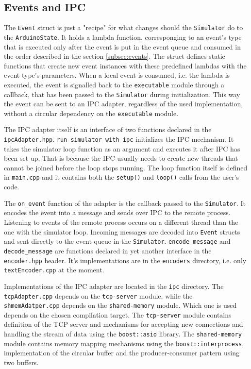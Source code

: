 \subsection{Events and IPC}\label{subsec:cpp-events}

The \texttt{Event} struct is just a "recipe" for what changes should the \texttt{Simulator} do to the \texttt{ArduinoState}. It holds a lambda function, corresponging to an event's type that is executed only after the event is put in the event queue and consumed in the order described in the section \ref{subsec:events}. The struct defines static functions that create new event instances with these predefined lambdas with the event type's parameters. When a local event is consumed, i.e. the lambda is executed, the event is signalled back to the \texttt{executable} module through a callback, that has been passed to the \texttt{Simulator} during initialization. This way the event can be sent to an IPC adapter, regardless of the used implementation, without a circular dependency on the \texttt{executable} module.

The IPC adapter itself is an interface of two functions declared in the \texttt{ipcAdapter.hpp}. \texttt{run\_simulator\_with\_ipc} initializes the IPC mechanism. It takes the simulator loop function as an argument and executes it after IPC has been set up. That is because the IPC usually needs to create new threads that cannot be joined before the loop stops running. The loop function itself is defined in \texttt{main.cpp} and it contains both the \texttt{setup()} and \texttt{loop()} calls from the user's code.

The \texttt{on\_event} function of the adapter is the callback passed to the \texttt{Simulator}. It encodes the event into a message and sends over IPC to the remote process. Listening to events of the remote process occurs on a different thread than the one with the simulator loop. Incoming messages are decoded into \texttt{Event} structs and sent directly to the event queue in the \texttt{Simulator}. \texttt{encode\_message} and \texttt{decode\_message} are functions declared in yet another interface in the \texttt{encoder.hpp} header. It's implementations are in the \texttt{encoders} directory, i.e. only \texttt{textEncoder.cpp} at the moment.

Implementations of the IPC adapter are located in the \texttt{ipc} directory. The \texttt{tcpAdapter.cpp} depends on the \texttt{tcp-server} module, while the \texttt{shmemAdatper.cpp} depends on the \texttt{shared-memory} module. Which one is used depends on the chosen compilation target. The \texttt{tcp-server} module contains definition of the TCP server and mechanisms for accepting new connections and handling the stream of data using the \texttt{boost::asio} library. The \texttt{shared-memory} module contains memory mapping mechanisms using the \texttt{boost::interprocess}, implementation of the circular buffer and the producer-consumer pattern using two buffers.

